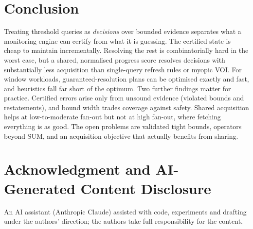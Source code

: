 \documentclass[conference]{IEEEtran}
\begin{document}
\section{Conclusion}
Treating threshold queries as \emph{decisions} over bounded evidence separates what a monitoring engine can certify
from what it is guessing. The certified state is cheap to maintain incrementally. Resolving the rest is
combinatorially hard in the worst case, but a shared, normalised progress score resolves decisions with
substantially less acquisition than single-query refresh rules or myopic VOI. For window workloads, guaranteed-resolution plans can be
optimised exactly and fast, and heuristics fall far short of the optimum. Two further findings matter for practice. Certified errors arise only from unsound evidence (violated bounds and
restatements), and bound width trades coverage against safety. Shared acquisition helps at low-to-moderate fan-out
but not at high fan-out, where fetching everything is as good. The open problems are validated tight bounds,
operators beyond SUM, and an acquisition objective that actually benefits from sharing.

\section*{Acknowledgment and AI-Generated Content Disclosure}
An AI assistant (Anthropic Claude) assisted with code, experiments and drafting under the authors' direction; the
authors take full responsibility for the content.



\end{document}
